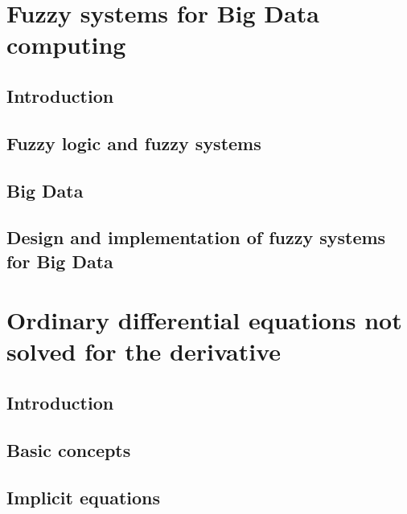 \documentclass[
  fontsize=12pt,
  a4paper,  %
  twoside,  %
  bibliography=totoc,
  headsepline,
  cleardoublepage=empty,
  draft=false
]{scrbook}
\theoremstyle{nonumberplain}
\begin{document}
%
%
\mainmatter

\part{Fuzzy systems for Big Data computing}

\chapter{Introduction}


\chapter{Fuzzy logic and fuzzy systems}


\chapter{Big Data}


\chapter{Design and implementation of fuzzy systems for Big Data}
\label{ch:fuzzy-bigdata}


\part{Ordinary differential equations not solved for the derivative}

\chapter{Introduction}


\chapter{Basic concepts}


\chapter{Implicit equations}

\end{document}
